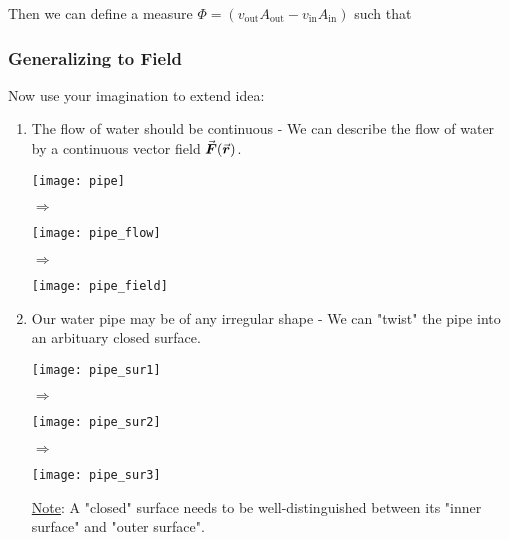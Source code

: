 \documentclass[class=article, crop=false, 12pt]{standalone}
\begin{document}
Then we can define a measure $\Phi = (v_\text{out}A_\text{out} - v_\text{in}A_\text{in})$
such that

\subsubsection{Generalizing to Field}

Now use your imagination to extend idea:

\begin{enumerate}
    \item The flow of water should be continuous - 
    We can describe the flow of water by a continuous vector field $\va*{F}(\va*{r})$.
    \begin{center}
        \begin{minipage}{0.3\linewidth}
            \centering
            \texttt{[image: pipe]}
        \end{minipage}
        \quad$\Rightarrow$\quad
        \begin{minipage}{0.3\linewidth}
            \centering
            \texttt{[image: pipe\_flow]}
        \end{minipage}
        \quad$\Rightarrow$\quad
        \begin{minipage}{0.2\linewidth}
            \centering
            \texttt{[image: pipe\_field]}
        \end{minipage}
    \end{center}

    \item Our water pipe may be of any irregular shape - 
    We can "twist" the pipe into an arbituary closed surface.
    \begin{center}
        \begin{minipage}{0.16\linewidth}
            \centering
            \texttt{[image: pipe\_sur1]}
        \end{minipage}
        \qquad$\Rightarrow$\qquad
        \begin{minipage}{0.16\linewidth}
            \centering
            \texttt{[image: pipe\_sur2]}
        \end{minipage}
        \qquad$\Rightarrow$\qquad
        \begin{minipage}{0.16\linewidth}
            \centering
            \texttt{[image: pipe\_sur3]}
        \end{minipage}
    \end{center}

    \ul{Note}: A "closed" surface needs to be well-distinguished between its
    "inner surface" and  "outer surface".

\end{enumerate}
\end{document}
